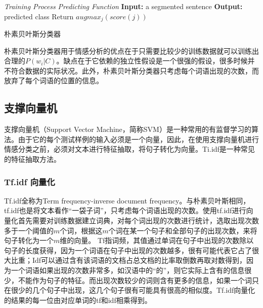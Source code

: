 \begin{algorithm}

\emph{Training Process}\;
\BlankLine
\emph{Predicting Function}\;
\textbf{Input:} a segmented sentence\;
\textbf{Output:} predicted class\;
Return $augmax_{j}(score(j))$
\caption{朴素贝叶斯分类器}\label{Naive Bayes}
\label{alog:algorithm2}
\end{algorithm}\DecMargin{1em}

朴素贝叶斯分类器用于情感分析的优点在于只需要比较少的训练数据就可以训练出合理的$P(w_i|C)$。缺点在于它依赖的独立性假设是一个很强的假设，很多时候并不符合数据的实际状况。此外，朴素贝叶斯分类器只考虑每个词语出现的次数，而放弃了每个词语的位置的信息。
\subsection{支撑向量机}
支撑向量机（Support Vector Machine，简称SVM）是一种常用的有监督学习的算法。由于它的每个测试样例的输入必须是一个向量，因此，在使用支撑向量机进行情感分类之前，必须对文本进行特征抽取，将句子转化为向量。Ti.idf是一种常见的特征抽取方法。
\subsubsection{Tf.idf 向量化}
Tf.idf全称为Term frequency-inverse document frequency。与朴素贝叶斯相同，tf.idf也是将文本看作“一袋子词”，只考虑每个词语出现的次数。使用tf.idf进行向量化首先需要对训练数据建立词典，对每个词出现的次数进行统计，选取出现次数多于一个阈值的$m$个词，根据这$m$个词在某一个句子和全部句子的出现次数，来将句子转化为一个$m$维的向量。
Tf指词频，其值通过单词在句子中出现的次数除以句子的长度获得，因为一个词语在句子中出现的次数越多，很有可能代表它占了很大比重；Idf可以通过含有该词语的文档占总文档的比率取倒数再取对数得到，因为一个词语如果出现的次数非常多，如汉语中的“的”，则它实际上含有的信息很少，不能作为句子的特征。而出现次数较少的词则含有更多的信息，如果一个词只在很少的几个句子中出现，这几个句子很有可能具有很高的相似度。Tf.idf向量化的结果的每一位由对应单词的tf和idf相乘得到。
